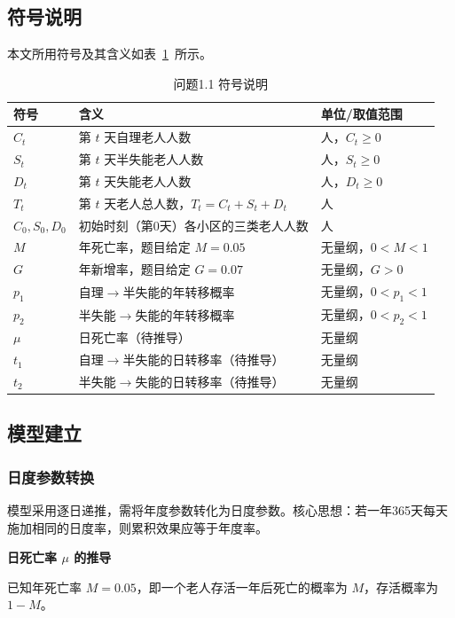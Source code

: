 \documentclass[12pt,a4paper]{article}
\begin{document}
\subsection{符号说明}

本文所用符号及其含义如表~\ref{tab:symbols_1.1}~所示。

\begin{table}[htbp]
\centering
\caption{问题1.1 符号说明}
\label{tab:symbols_1.1}
\begin{tabular}{lll}
\toprule
符号 & 含义 & 单位/取值范围 \\
\midrule
$C_t$ & 第 $t$ 天自理老人人数 & 人，$C_t \geq 0$ \\
$S_t$ & 第 $t$ 天半失能老人人数 & 人，$S_t \geq 0$ \\
$D_t$ & 第 $t$ 天失能老人人数 & 人，$D_t \geq 0$ \\
$T_t$ & 第 $t$ 天老人总人数，$T_t = C_t + S_t + D_t$ & 人 \\
$C_0, S_0, D_0$ & 初始时刻（第0天）各小区的三类老人人数 & 人 \\
$M$ & 年死亡率，题目给定 $M=0.05$ & 无量纲，$0 < M < 1$ \\
$G$ & 年新增率，题目给定 $G=0.07$ & 无量纲，$G > 0$ \\
$p_1$ & 自理$\to$半失能的年转移概率 & 无量纲，$0 < p_1 < 1$ \\
$p_2$ & 半失能$\to$失能的年转移概率 & 无量纲，$0 < p_2 < 1$ \\
$\mu$ & 日死亡率（待推导） & 无量纲 \\
$t_1$ & 自理$\to$半失能的日转移率（待推导） & 无量纲 \\
$t_2$ & 半失能$\to$失能的日转移率（待推导） & 无量纲 \\
\bottomrule
\end{tabular}
\end{table}

\subsection{模型建立}

\subsubsection{日度参数转换}

模型采用逐日递推，需将年度参数转化为日度参数。核心思想：若一年365天每天施加相同的日度率，则累积效果应等于年度率。

\noindent\textbf{日死亡率 $\mu$ 的推导}

已知年死亡率 $M=0.05$，即一个老人存活一年后死亡的概率为 $M$，存活概率为 $1-M$。
\end{document}
